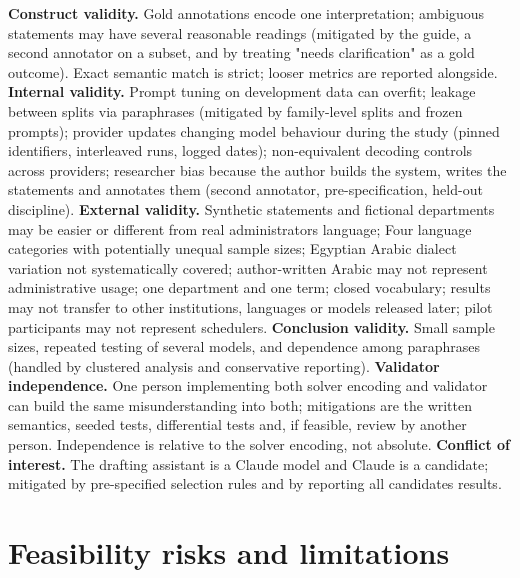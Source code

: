 \documentclass[
  11pt,a4paper,oneside]{report}
\begin{document}
\textbf{Construct validity.} Gold annotations encode one interpretation;
ambiguous statements may have several reasonable readings (mitigated by
the guide, a second annotator on a subset, and by treating "needs
clarification" as a gold outcome). Exact semantic match is strict;
looser metrics are reported alongside. \textbf{Internal validity.}
Prompt tuning on development data can overfit; leakage between splits
via paraphrases (mitigated by family-level splits and frozen prompts);
provider updates changing model behaviour during the study (pinned
identifiers, interleaved runs, logged dates); non-equivalent decoding
controls across providers; researcher bias because the author builds the
system, writes the statements and annotates them (second annotator,
pre-specification, held-out discipline). \textbf{External validity.}
Synthetic statements and fictional departments may be easier or
different from real administrators\textquotesingle{} language;
Four language categories with potentially unequal sample sizes; Egyptian Arabic dialect variation not systematically covered; author-written Arabic may not represent administrative usage; one department and one term; closed vocabulary; results
may not transfer to other institutions, languages or models released
later; pilot participants may not represent schedulers.
\textbf{Conclusion validity.} Small sample sizes, repeated testing of
several models, and dependence among paraphrases (handled by clustered
analysis and conservative reporting). \textbf{Validator independence.}
One person implementing both solver encoding and validator can build the
same misunderstanding into both; mitigations are the written semantics,
seeded tests, differential tests and, if feasible, review by another
person. Independence is relative to the solver encoding, not absolute.
\textbf{Conflict of interest.} The drafting assistant is a Claude model
and Claude is a candidate; mitigated by pre-specified selection rules
and by reporting all candidates\textquotesingle{} results.

\hypertarget{feasibility-risks-and-limitations}{%
\section{Feasibility risks and
limitations}\label{feasibility-risks-and-limitations}}
\end{document}
